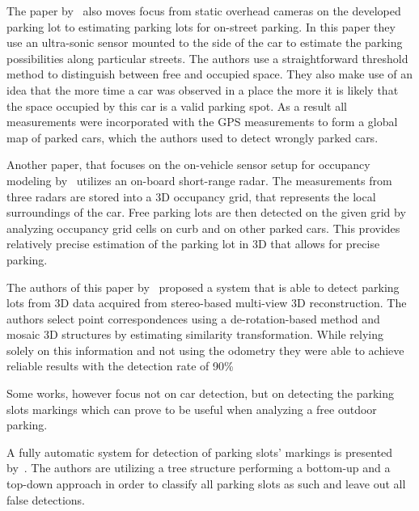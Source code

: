 The paper by~\cite{vladimircoric} also moves focus from static overhead
cameras on the developed parking lot to estimating parking lots for on-street
parking. In this paper they use an ultra-sonic sensor mounted to the side of
the car to estimate the parking possibilities along particular streets. The
authors use a straightforward threshold method to distinguish between free and
occupied space. They also make use of an idea that the more time a car was
observed in a place the more it is likely that the space occupied by this car
is a valid parking spot. As a result all measurements were incorporated with
the GPS measurements to form a global map of parked cars, which the authors
used to detect wrongly parked cars.

Another paper, that focuses on the on-vehicle sensor setup for occupancy
modeling by~\cite{schmid11} utilizes an on-board short-range radar. The
measurements from three radars are stored into a 3D occupancy grid, that
represents the local surroundings of the car. Free parking lots are then
detected on the given grid by analyzing occupancy grid cells on curb and on
other parked cars. This provides relatively precise estimation of the parking
lot in 3D that allows for precise parking.

The authors of this paper by~\cite{suhr10} proposed a system that is able to detect
parking lots from 3D data acquired from stereo-based multi-view 3D
reconstruction. The authors select point correspondences using a
de-rotation-based method and mosaic 3D structures by estimating similarity
transformation. While relying solely on this information and not using the
odometry they were able to achieve reliable results with the detection rate of
90\%

Some works, however focus not on car detection, but on detecting the parking
slots markings which can prove to be useful when analyzing a free outdoor
parking.

A fully automatic system for detection of parking slots' markings is presented
by~\cite{suhr13}. The authors are utilizing a tree structure performing a
bottom-up and a top-down approach in order to classify all parking slots as
such and leave out all false detections.
